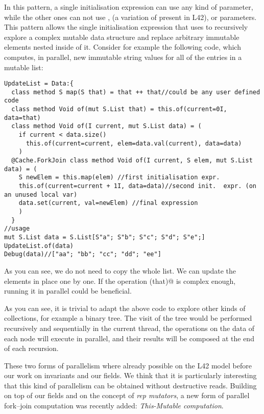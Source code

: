 In this pattern, a single initialisation expression can use any kind of parameter, while the other ones can not 
use \Q@mut@, \Q@lent@ (a variation of \Q@mut@ present in L42), or \Q@read@ parameters.
This pattern allows the single initialisation expression that uses \Q@mut@ to recursively explore a complex mutable data structure and replace arbitrary immutable elements nested inside of it.
Consider for example the following code, which computes, in parallel,
new immutable string values for all of
the entries in a mutable list:

\begin{lstlisting}[deletekeywords=label]
UpdateList = Data:{
  class method S map(S that) = that ++ that//could be any user defined code
  class method Void of(mut S.List that) = this.of(current=0I, data=that)  
  class method Void of(I current, mut S.List data) = (
    if current < data.size() 
      this.of(current=current, elem=data.val(current), data=data)
    )
  @Cache.ForkJoin class method Void of(I current, S elem, mut S.List data) = (
    S newElem = this.map(elem) //first initialisation expr.
    this.of(current=current + 1I, data=data)//second init.  expr. (on an unused local var)
    data.set(current, val=newElem) //final expression
    )
  }
//usage
mut S.List data = S.List[S"a"; S"b"; S"c"; S"d"; S"e";]
UpdateList.of(data)
Debug(data)//["aa"; "bb"; "cc"; "dd"; "ee"]
\end{lstlisting}
As you can see, we do not need to copy the whole list. We can update the elements in place one by one.
If the operation \Q@map(that)@ is complex enough, running it in parallel could be beneficial.

As you can see, it is trivial to adapt the above code to explore other kinds of collections, for example a binary tree.
The visit of the tree would be performed recursively and sequentially in the current thread, the operations on the data of each node will execute in parallel, and their results will be composed at the end of each recursion.

These two forms of parallelism where already possible on the L42 model before our work on invariants and our \Q@rep@ fields.
We think that it is particularly interesting that this kind of parallelism can be obtained without destructive reads.
Building on top of our \Q@rep@ fields and on the concept of \emph{rep mutators}, a new form of parallel fork--join computation was recently added:
\emph{This-Mutable computation}.


